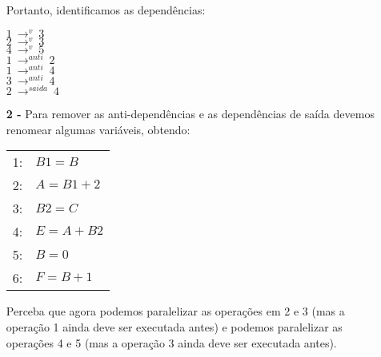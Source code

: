 \documentclass[12pt]{article}
\begin{document}
\begin{itemize}
			Portanto, identificamos as dependências:\\
			\begin{center}
				$1 \ \longrightarrow^v \ 3$\\
				$2 \ \longrightarrow^v \ 3$\\
				$4 \ \longrightarrow^v \ 5$\\
				\hfill\newline
				$1 \ \longrightarrow^{anti} \ 2$\\
				$1 \ \longrightarrow^{anti} \ 4$\\
				$3 \ \longrightarrow^{anti} \ 4$\\
				\hfill\newline
				$2 \ \longrightarrow^{saida} \ 4$\\
			\end{center}
		\item[\textbf{2 -}]
			\hfill\newline
			Para remover as anti-dependências e as dependências de saída  devemos
			renomear algumas variáveis, obtendo:
			\begin{center}
				\begin{tabular}{cl}
					1: & $B1 = B$\\
					2: & $A = B1 + 2$\\
					3: & $B2 = C$\\
					4: & $E = A + B2$\\
					5: & $B = 0$\\
					6: & $F = B + 1$\\		
				\end{tabular}			
			\end{center}
			Perceba que agora podemos paralelizar as operações em 2 e 3 (mas a operação
			1 ainda deve ser executada antes) e podemos paralelizar as operações 4 e 5 (mas
			a operação 3 ainda deve ser executada antes).
	\end{itemize}
\end{document}
